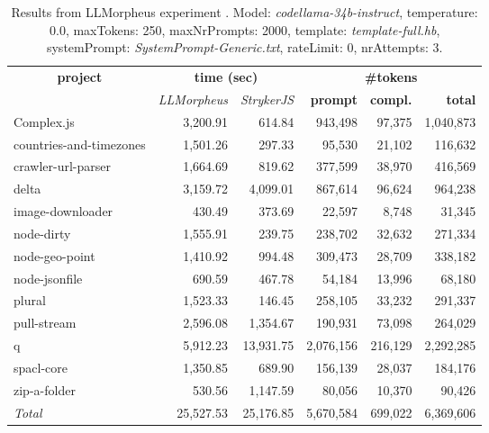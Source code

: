 
\begin{table*}[hbt!]
\centering
{\scriptsize
\begin{tabular}{l||r|r|r|r|r}
\multicolumn{1}{c|}{\bf project} & \multicolumn{2}{|c|}{\bf time (sec)} & \multicolumn{3}{|c|}{\bf \#tokens} \\
               & {\it LLMorpheus} & {\it StrykerJS} & {\bf prompt} & {\bf compl.} & {\bf total} \\
\hline
  Complex.js & 3,200.91 & 614.84 & 943,498 & 97,375 & 1,040,873 \\ 
countries-and-timezones & 1,501.26 & 297.33 & 95,530 & 21,102 & 116,632 \\ 
crawler-url-parser & 1,664.69 & 819.62 & 377,599 & 38,970 & 416,569 \\ 
delta & 3,159.72 & 4,099.01 & 867,614 & 96,624 & 964,238 \\ 
image-downloader & 430.49 & 373.69 & 22,597 & 8,748 & 31,345 \\ 
node-dirty & 1,555.91 & 239.75 & 238,702 & 32,632 & 271,334 \\ 
node-geo-point & 1,410.92 & 994.48 & 309,473 & 28,709 & 338,182 \\ 
node-jsonfile & 690.59 & 467.78 & 54,184 & 13,996 & 68,180 \\ 
plural & 1,523.33 & 146.45 & 258,105 & 33,232 & 291,337 \\ 
pull-stream & 2,596.08 & 1,354.67 & 190,931 & 73,098 & 264,029 \\ 
q & 5,912.23 & 13,931.75 & 2,076,156 & 216,129 & 2,292,285 \\ 
spacl-core & 1,350.85 & 689.90 & 156,139 & 28,037 & 184,176 \\ 
zip-a-folder & 530.56 & 1,147.59 & 80,056 & 10,370 & 90,426 \\ 
\hline
  \textit{Total} & 25,527.53 & 25,176.85 & 5,670,584 & 699,022 & 6,369,606 \\
  \end{tabular}
  }
  \\[2mm]
  \caption{Results from LLMorpheus experiment .
    Model: \textit{codellama-34b-instruct}, 
    temperature: 0.0, 
    maxTokens: 250, 
    maxNrPrompts: 2000, 
    template: \textit{template-full.hb}, 
    systemPrompt: \textit{SystemPrompt-Generic.txt}, 
    rateLimit: 0, 
    nrAttempts: 3.  
  }
  \label{table:Cost:run388:codellama-34b-instruct:template-full.hb:0.0}
\end{table*}